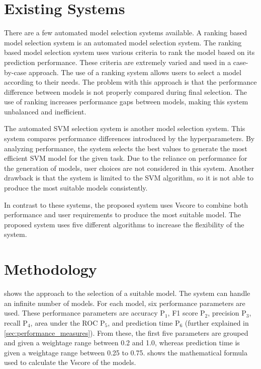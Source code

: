 \section{Existing Systems}\label{sec:existing_systems}

There are a few automated model selection systems available. A ranking based model selection system is an automated model selection system. The ranking based model selection system uses various criteria to rank the model based on its prediction performance. These criteria are extremely varied and used in a case-by-case approach. The use of a ranking system allows users to select a model according to their needs. The problem with this approach is that the performance difference between models is not properly compared during final selection. The use of ranking increases performance gaps between models, making this system unbalanced and inefficient.

The automated SVM selection system is another model selection system. This system compares performance differences introduced by the hyperparameters. By analyzing performance, the system selects the best values to generate the most efficient SVM model for the given task. Due to the reliance on performance for the generation of models, user choices are not considered in this system. Another drawback is that the system is limited to the SVM algorithm, so it is not able to produce the most suitable models consistently.

In contrast to these systems, the proposed system uses Vscore to combine both performance and user requirements to produce the most suitable model. The proposed system uses five different algorithms to increase the flexibility of the system.

\section{Methodology}\label{sec:methodology}

 shows the approach to the selection of a suitable model. The system can handle an infinite number of models. For each model, six performance parameters are used. These performance parameters are accuracy P$_1$, F1 score P$_2$, precision P$_3$, recall P$_4$, area under the ROC P$_5$, and prediction time P$_6$ (further explained in \cref{sec:performance_measures}). From these, the first five parameters are grouped and given a weightage range between 0.2 and 1.0, whereas prediction time is given a weightage range between 0.25 to 0.75.  shows the mathematical formula used to calculate the Vscore of the models.

